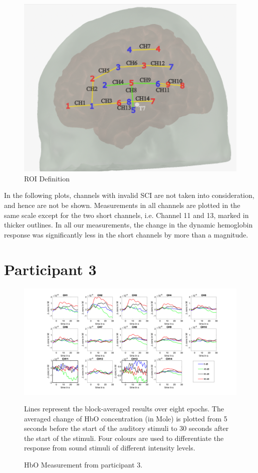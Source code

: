 \vspace{1cm}
\begin{figure}[H]
  \centering
    \includegraphics[scale=.45]{bilder/optode_roi_ink.png}
  \caption{ROI Definition}
\end{figure}


In the following plots, channels with invalid SCI are not taken into consideration, and hence are not be shown. Measurements in all channels are plotted in the same scale except for the two short channels, i.e. Channel 11 and 13, marked in thicker outlines. In all our measurements, the change in the dynamic hemoglobin response was significantly less in the short channels by more than a magnitude.
\newpage



\section {Participant 3}

\begin{figure}[H]
  \centering
    \includegraphics[scale=.4]{bilder/HbO_Mole/sub_jonas_s_HbO.png}
  \caption{HbO Measurement from participant 3.}
  \label{fig:somesignal}
  \medskip
  \footnotesize {Lines represent the block-averaged results over eight epochs. The averaged change of HbO concentration (in Mole) is plotted from 5 seconds before the start of the auditory stimuli to 30 seconds after the start of the stimuli. Four colours are used to differentiate the response from sound stimuli of different intensity levels.}
\end{figure}


